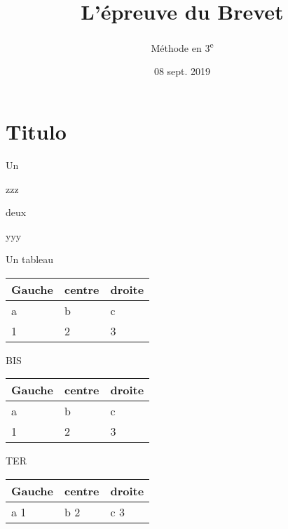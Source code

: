 \documentclass[ignorenonframetext,]{beamer}
\title{L'épreuve du Brevet}
\author{Méthode en 3\textsuperscript{e}}
\date{08 sept. 2019}
\begin{document}
\frame{\titlepage}

\section{Titulo}\label{titulo}

\begin{frame}{Un}

zzz

\end{frame}

\begin{frame}{deux}

yyy

\end{frame}

\begin{frame}{Un tableau}

\begin{longtable}[]{@{}lll@{}}
\toprule
Gauche & centre & droite\tabularnewline
\midrule
\endhead
a & b & c\tabularnewline
1 & 2 & 3\tabularnewline
\bottomrule
\end{longtable}

\end{frame}

\begin{frame}{BIS}

\begin{longtable}[]{@{}lll@{}}
\toprule
Gauche & centre & droite\tabularnewline
\midrule
\endhead
a & b & c\tabularnewline
1 & 2 & 3\tabularnewline
\bottomrule
\end{longtable}

\end{frame}

\begin{frame}{TER}

\begin{longtable}[]{@{}lll@{}}
\toprule
\begin{minipage}[b]{0.11\columnwidth}\raggedright\strut
Gauche\strut
\end{minipage} & \begin{minipage}[b]{0.13\columnwidth}\raggedright\strut
centre\strut
\end{minipage} & \begin{minipage}[b]{0.13\columnwidth}\raggedright\strut
droite\strut
\end{minipage}\tabularnewline
\midrule
\endhead
\begin{minipage}[t]{0.11\columnwidth}\raggedright\strut
a 1\strut
\end{minipage} & \begin{minipage}[t]{0.13\columnwidth}\raggedright\strut
b 2\strut
\end{minipage} & \begin{minipage}[t]{0.13\columnwidth}\raggedright\strut
c 3\strut
\end{minipage}\tabularnewline
\bottomrule
\end{longtable}

\end{frame}
\end{document}
